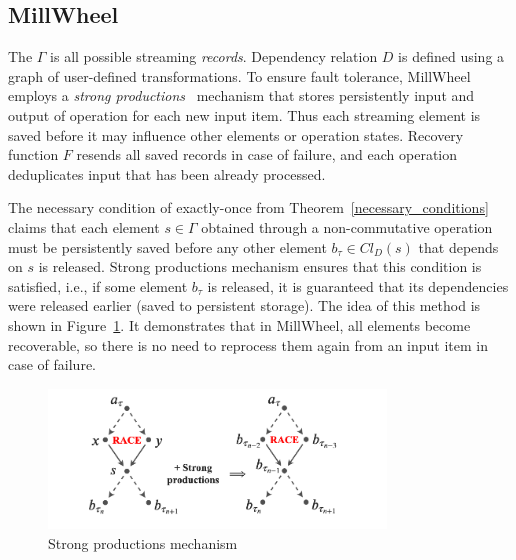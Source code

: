 
\subsection{MillWheel}

 The $\Gamma$ is all possible streaming {\em records}. Dependency relation $D$ is defined using a graph of user-defined transformations. 
 To ensure fault tolerance,   MillWheel employs a {\em strong productions}~\cite{Akidau:2013:MFS:2536222.2536229}   mechanism that stores persistently input and output of operation for each new input item.
 Thus each streaming element is saved before it may influence other elements or operation states. 
 Recovery function $F$ resends all saved records in case of failure, and each operation deduplicates input that has been already processed.

The necessary condition of exactly-once from Theorem~\ref{necessary_conditions} claims that each element $s \in \Gamma$ obtained through a non-commutative operation must be persistently saved before any other element $b_{\tau} \in Cl_D(s)$ that depends on $s$ is released. Strong productions mechanism ensures that this condition is satisfied, i.e., if some element $b_\tau$ is released, it is guaranteed that its dependencies were released earlier (saved to persistent storage). The idea of this method is shown in Figure~\ref{millwheel}. It demonstrates that in MillWheel, all elements become recoverable, so there is no need to reprocess them again from an input item in case of failure. 

\begin{figure}[t]
  \centering
  \includegraphics[width=0.8\textwidth]{Chapters/DeliveryGuarantees/pics/millwheel.png}
  \caption{Strong productions mechanism}
  \label{millwheel}
\end{figure}

